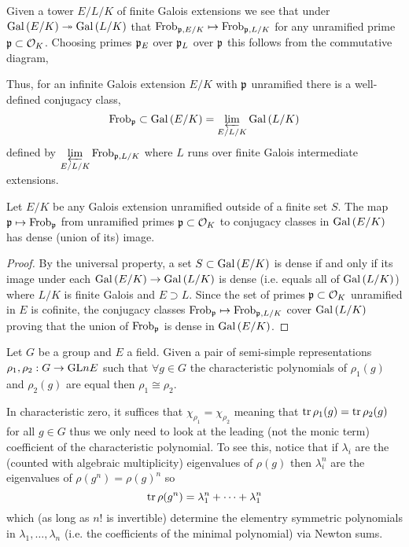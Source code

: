 \documentclass[12pt]{article}
\begin{document}
\begin{rmk}
Given a tower $E/L/K$ of finite Galois extensions we see that under $\mathrm{Gal}\left( E/K \right) \twoheadrightarrow \mathrm{Gal}\left( L/K \right)$ that $\mathrm{Frob}_{\mathfrak{p}, E/K} \mapsto \mathrm{Frob}_{\mathfrak{p}, L/K}$ for any unramified prime $\mathfrak{p} \subset \mathcal{O}_{K}$. Choosing primes $\mathfrak{p}_E$ over $\mathfrak{p}_L$ over $\mathfrak{p}$ this follows from the commutative diagram,
\begin{center}
\end{center}
Thus, for an infinite Galois extension $E / K$ with $\mathfrak{p}$ unramified there is a well-defined conjugacy class,
\[ \mathrm{Frob}_{\mathfrak{p}} \subset \mathrm{Gal}\left( E/K \right) = \varprojlim_{E/L/K} \mathrm{Gal}\left( L/K \right) \]
defined by $\varprojlim\limits_{E/L/K} \mathrm{Frob}_{\mathfrak{p}, L/K}$ where $L$ runs over finite Galois intermediate extensions.
\end{rmk}

\begin{prop}
Let $E/K$ be any Galois extension unramified outside of a finite set $S$. The map $\mathfrak{p} \mapsto \mathrm{Frob}_{\mathfrak{p}}$ from unramified primes $\mathfrak{p} \subset \mathcal{O}_{K}$ to conjugacy classes in $\mathrm{Gal}\left( E/K \right)$ has dense (union of its) image.
\end{prop}

\begin{proof}
By the universal property, a set $S \subset \mathrm{Gal}\left( E/K \right)$ is dense if and only if its image under each $\mathrm{Gal}\left( E/K \right) \to \mathrm{Gal}\left( L/K \right)$ is dense (i.e. equals all of $\mathrm{Gal}\left( L/K \right)$) where $L/K$ is finite Galois and $E \supset L$. Since the set of primes $\mathfrak{p} \subset \mathcal{O}_{K}$ unramified in $E$ is cofinite, the conjugacy classes $\mathrm{Frob}_{\mathfrak{p}} \mapsto \mathrm{Frob}_{\mathfrak{p}, L/K}$ cover $\mathrm{Gal}\left( L/K \right)$ proving that the union of $\mathrm{Frob}_{\mathfrak{p}}$ is dense in $\mathrm{Gal}\left( E/K \right)$. 
\end{proof}

\begin{thm}
Let $G$ be a group and $E$ a field. Given a pair of semi-simple representations $\rho_1, \rho_2 : G \to \mathrm{GL}{n}{E}$ such that $\forall g \in G$ the characteristic polynomials of $\rho_1(g)$ and $\rho_2(g)$ are equal then $\rho_1 \cong \rho_2$.
\end{thm}

\begin{rmk}
In characteristic zero, it suffices that $\chi_{\rho_1} = \chi_{\rho_2}$ meaning that $\operatorname{\mathrm{tr}}{\rho_1(g)} = \operatorname{\mathrm{tr}}{\rho_2(g)}$ for all $g \in G$ thus we only need to look at the leading (not the monic term) coefficient of the characteristic polynomial.  To see this, notice that if $\lambda_i$ are the (counted with algebraic multiplicity) eigenvalues of $\rho(g)$ then $\lambda_i^n$ are the eigenvalues of $\rho(g^n) = \rho(g)^n$ so 
\[ \operatorname{\mathrm{tr}}{\rho(g^n)} = \lambda_1^n + \cdots + \lambda_1^n \]
which (as long as $n!$ is invertible) determine the elementry symmetric polynomials in $\lambda_1, \dots, \lambda_n$ (i.e. the coefficients of the minimal polynomial) via Newton sums. 
\end{rmk}
\end{document}
